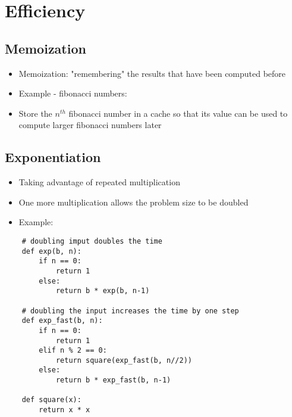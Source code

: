 \chapter{Efficiency}

\section{Memoization}
\begin{itemize}
    \item Memoization: "remembering" the results that have been computed before
    \item Example - fibonacci numbers:
    \item Store the $n^{th}$ fibonacci number in a cache so that its value can be used to compute larger fibonacci numbers later
\end{itemize}

\section{Exponentiation}
\begin{itemize}
    \item Taking advantage of repeated multiplication
    \item One more multiplication allows the problem size to be doubled
    \item Example:
\end{itemize}
\begin{verbatim}
    # doubling imput doubles the time
    def exp(b, n):
        if n == 0:
            return 1
        else:
            return b * exp(b, n-1)

    # doubling the input increases the time by one step
    def exp_fast(b, n):
        if n == 0:
            return 1
        elif n % 2 == 0:
            return square(exp_fast(b, n//2))
        else:
            return b * exp_fast(b, n-1)

    def square(x):
        return x * x
\end{verbatim}

